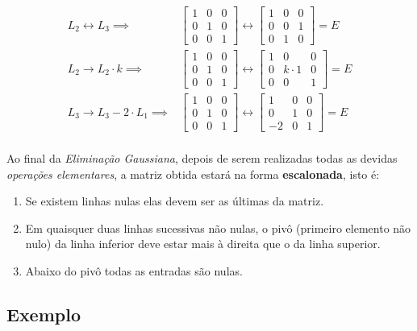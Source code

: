 \documentclass[12pt]{article}
\begin{document}
\begin{align}
	L_2\leftrightarrow L_3 \implies &
	\begin{bmatrix}
		1 & 0 &0\\
		0 & 1 & 0\\
		0 & 0 & 1
	\end{bmatrix} \leftrightarrow 
	\begin{bmatrix}
		1 & 0 &0\\
		0 & 0 & 1\\
		0 & 1 & 0
	\end{bmatrix}=E\\
	L_2\rightarrow L_2 \cdot k\implies &
	\begin{bmatrix}
		1 & 0 &0\\
		0 & 1 & 0\\
		0 & 0 & 1
	\end{bmatrix} \leftrightarrow 
	\begin{bmatrix}
		1 & 0 &0\\
		0 & k\cdot 1 & 0\\
		0 & 0 & 1
	\end{bmatrix}=E\\
	L_3 \rightarrow L_3-2\cdot L_1 \implies &
	\begin{bmatrix}
		1 & 0 &0\\
		0 & 1 & 0\\
		0 & 0 & 1
	\end{bmatrix} \leftrightarrow 
	\begin{bmatrix}
		1 & 0 &0\\
		0 & 1 & 0\\
		-2 & 0 & 1
	\end{bmatrix}=E
\end{align}\\

Ao final da \textit{Eliminação Gaussiana}, depois de serem realizadas todas as devidas \textit{operações elementares}, a matriz obtida estará na forma \textbf{escalonada}, isto é:
\begin{enumerate}
	\item Se existem linhas nulas elas devem ser as últimas da matriz.
	\item Em quaisquer duas linhas sucessivas não nulas, o pivô (primeiro elemento não nulo) da linha inferior deve estar mais à direita que o da linha superior.
	\item Abaixo do pivô todas as entradas são nulas.
\end{enumerate}

\subsection{Exemplo}
\end{document}
